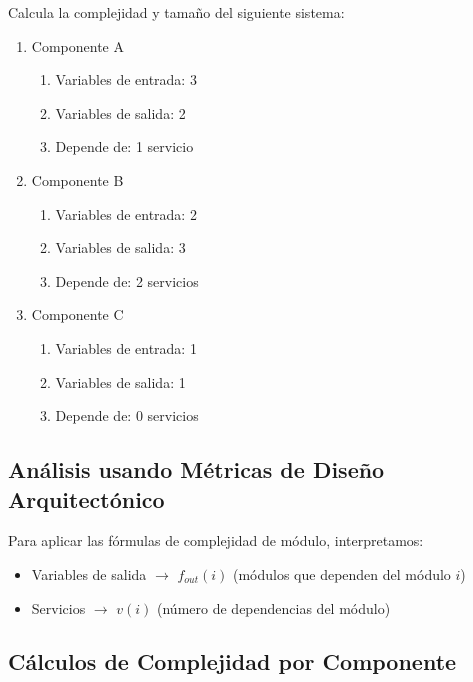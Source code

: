 
\begin{enunciado}
    Calcula la complejidad y tamaño del siguiente sistema:
    \begin{enumerate}
        \item Componente A
        \begin{enumerate}
            \item Variables de entrada: 3
            \item Variables de salida: 2
            \item Depende de: 1 servicio
        \end{enumerate}

        \item Componente B
        \begin{enumerate}
            \item Variables de entrada: 2
            \item Variables de salida: 3
            \item Depende de: 2 servicios
        \end{enumerate}
        \item Componente C
        \begin{enumerate}
            \item Variables de entrada: 1
            \item Variables de salida: 1
            \item Depende de: 0 servicios
        \end{enumerate}
    \end{enumerate}
\end{enunciado}

\subsection{Análisis usando Métricas de Diseño Arquitectónico}\label{subsec:analisis-usando-metricas-de-diseno-arquitectonico}
Para aplicar las fórmulas de complejidad de módulo, interpretamos:
\begin{itemize}
    \item Variables de salida $\rightarrow$ $f_{out}(i)$ (módulos que dependen del módulo $i$)
    \item Servicios $\rightarrow$ $v(i)$ (número de dependencias del módulo)
\end{itemize}

\subsection{Cálculos de Complejidad por Componente}\label{subsec:calculos-de-complejidad-por-componente}

